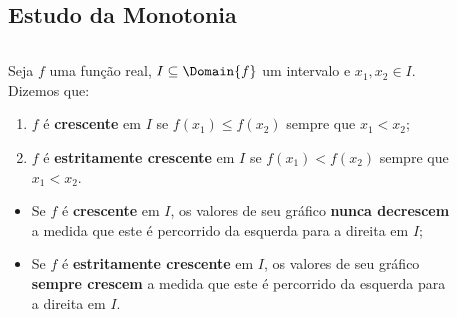 \subsection{Estudo da Monotonia}
\begin{frame}
  \begin{columns}[onlytextwidth]
    \begin{column}{0.49\textwidth}\vspace*{-0.5cm}
      \begin{definition}
        Seja $f$ uma função real, $I\subseteq\Domain{f}$ um intervalo e $x_{1},x_{2}\in I$. Dizemos que: 
        \begin{enumerate}
          \item $f$ é \textbf{crescente} em $I$ se $f(x_{1}) \leq f(x_{2})$ sempre que $x_{1} < x_{2}$;
          \item $f$ é \textbf{estritamente crescente} em $I$ se $f(x_{1}) < f(x_{2})$ sempre que $x_{1} < x_{2}$.
        \end{enumerate}
      \end{definition}
      \begin{itemize}
        \item Se $f$ é \textbf{crescente} em $I$, os valores de seu gráfico \textbf{nunca decrescem} a medida que este é percorrido da esquerda para a direita em $I$;
        \item Se $f$ é \textbf{estritamente crescente} em $I$, os valores de seu gráfico \textbf{sempre crescem} a medida que este é percorrido da esquerda para a direita em $I$.
      \end{itemize}
    \end{column}
    \begin{column}{0.49\textwidth}
      \begin{figure}
      \end{figure}
    \end{column}
  \end{columns}
\end{frame}

